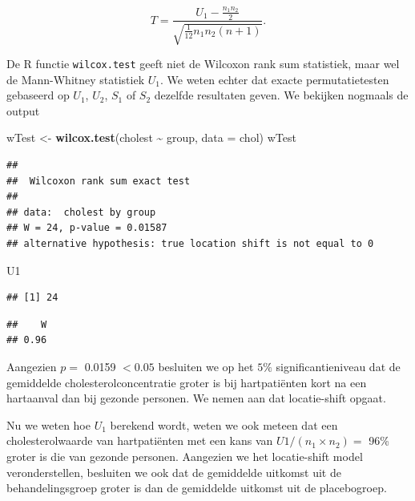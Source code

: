 \documentclass[
  12pt,dutch]{book}
\newenvironment{Shaded}{\begin{snugshade}}{\end{snugshade}}
\newcommand{\AttributeTok}[1]{\textcolor[rgb]{0.13,0.29,0.53}{#1}}
\newcommand{\FunctionTok}[1]{\textcolor[rgb]{0.13,0.29,0.53}{\textbf{#1}}}
\newcommand{\NormalTok}[1]{#1}
\newcommand{\OtherTok}[1]{\textcolor[rgb]{0.56,0.35,0.01}{#1}}
\newcommand{\SpecialCharTok}[1]{\textcolor[rgb]{0.81,0.36,0.00}{\textbf{#1}}}
\theoremstyle{definition}
\theoremstyle{definition}
\theoremstyle{definition}
\theoremstyle{definition}
\theoremstyle{remark}
\begin{document}
\[
  T = \frac{U_1 - \frac{n_1n_2}{2}}{\sqrt{\frac{1}{12}n_1n_2(n+1)}}.
\]

De R functie \texttt{wilcox.test} geeft niet de Wilcoxon rank sum statistiek, maar wel de Mann-Whitney statistiek \(U_1\).
We weten echter dat exacte permutatietesten gebaseerd op \(U_1\), \(U_2\), \(S_1\) of \(S_2\) dezelfde resultaten geven.
We bekijken nogmaals de output

\begin{Shaded}
\begin{Highlighting}[]
\NormalTok{wTest }\OtherTok{\textless{}{-}} \FunctionTok{wilcox.test}\NormalTok{(cholest }\SpecialCharTok{\textasciitilde{}}\NormalTok{ group, }\AttributeTok{data =}\NormalTok{ chol)}
\NormalTok{wTest}
\end{Highlighting}
\end{Shaded}

\begin{verbatim}
## 
##  Wilcoxon rank sum exact test
## 
## data:  cholest by group
## W = 24, p-value = 0.01587
## alternative hypothesis: true location shift is not equal to 0
\end{verbatim}

\begin{Shaded}
\begin{Highlighting}[]
\NormalTok{U1}
\end{Highlighting}
\end{Shaded}

\begin{verbatim}
## [1] 24
\end{verbatim}

\begin{Shaded}
\end{Shaded}

\begin{verbatim}
##    W 
## 0.96
\end{verbatim}

Aangezien \(p=\) 0.0159 \(<0.05\) besluiten we op het \(5\%\) significantieniveau dat de gemiddelde cholesterolconcentratie groter is bij hartpatiënten kort na een hartaanval dan bij gezonde personen. We nemen aan dat locatie-shift opgaat.

Nu we weten hoe \(U_1\) berekend wordt, weten we ook meteen dat een cholesterolwaarde van hartpatiënten met een kans van
\(U1/(n_1\times n_2)=\) 96\%
groter is die van gezonde personen. Aangezien we het locatie-shift model veronderstellen, besluiten we ook dat de gemiddelde uitkomst uit de behandelingsgroep groter is dan de gemiddelde uitkomst uit de placebogroep.
\end{document}
